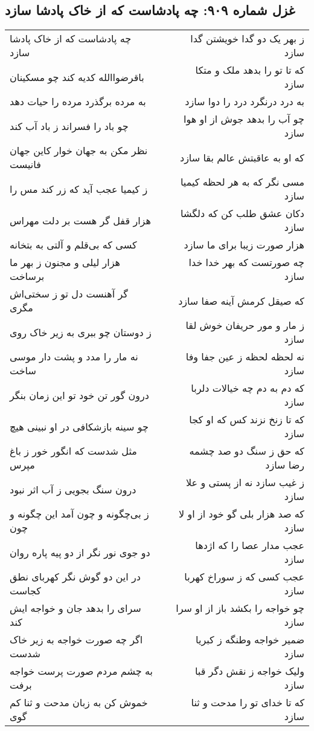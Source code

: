 \begin{center}
\section*{غزل شماره ۹۰۹: چه پادشاست که از خاک پادشا سازد}
\label{sec:0909}
\begin{longtable}{l p{0.5cm} r}
چه پادشاست که از خاک پادشا سازد
&&
ز بهر یک دو گدا خویشتن گدا سازد
\\
باقرضواالله کدیه کند چو مسکینان
&&
که تا تو را بدهد ملک و متکا سازد
\\
به مرده برگذرد مرده را حیات دهد
&&
به درد درنگرد درد را دوا سازد
\\
چو باد را فسراند ز باد آب کند
&&
چو آب را بدهد جوش از او هوا سازد
\\
نظر مکن به جهان خوار کاین جهان فانیست
&&
که او به عاقبتش عالم بقا سازد
\\
ز کیمیا عجب آید که زر کند مس را
&&
مسی نگر که به هر لحظه کیمیا سازد
\\
هزار قفل گر هست بر دلت مهراس
&&
دکان عشق طلب کن که دلگشا سازد
\\
کسی که بی‌قلم و آلتی به بتخانه
&&
هزار صورت زیبا برای ما سازد
\\
هزار لیلی و مجنون ز بهر ما برساخت
&&
چه صورتست که بهر خدا خدا سازد
\\
گر آهنست دل تو ز سختی‌اش مگری
&&
که صیقل کرمش آینه صفا سازد
\\
ز دوستان چو ببری به زیر خاک روی
&&
ز مار و مور حریفان خوش لقا سازد
\\
نه مار را مدد و پشت دار موسی ساخت
&&
نه لحظه لحظه ز عین جفا وفا سازد
\\
درون گور تن خود تو این زمان بنگر
&&
که دم به دم چه خیالات دلربا سازد
\\
چو سینه بازشکافی در او نبینی هیچ
&&
که تا زنخ نزند کس که او کجا سازد
\\
مثل شدست که انگور خور ز باغ مپرس
&&
که حق ز سنگ دو صد چشمه رضا سازد
\\
درون سنگ بجویی ز آب اثر نبود
&&
ز غیب سازد نه از پستی و علا سازد
\\
ز بی‌چگونه و چون آمد این چگونه و چون
&&
که صد هزار بلی گو خود از او لا سازد
\\
دو جوی نور نگر از دو پیه پاره روان
&&
عجب مدار عصا را که اژدها سازد
\\
در این دو گوش نگر کهربای نطق کجاست
&&
عجب کسی که ز سوراخ کهربا سازد
\\
سرای را بدهد جان و خواجه ایش کند
&&
چو خواجه را بکشد باز از او سرا سازد
\\
اگر چه صورت خواجه به زیر خاک شدست
&&
ضمیر خواجه وطنگه ز کبریا سازد
\\
به چشم مردم صورت پرست خواجه برفت
&&
ولیک خواجه ز نقش دگر قبا سازد
\\
خموش کن به زبان مدحت و ثنا کم گوی
&&
که تا خدای تو را مدحت و ثنا سازد
\\
\end{longtable}
\end{center}
